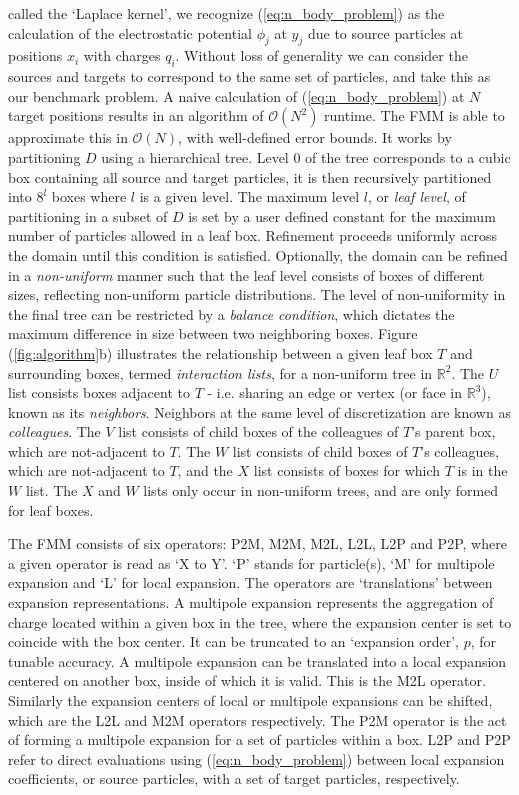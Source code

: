 \documentclass{IEEEcsmag}
\begin{document}
called the `Laplace kernel', we recognize (\ref{eq:n_body_problem}) as the calculation of the electrostatic potential $\phi_j$ at $y_j$ due to source particles at positions $x_i$ with charges $q_i$. Without loss of generality we can consider the sources and targets to correspond to the same set of particles, and take this as our benchmark problem. A naive calculation of (\ref{eq:n_body_problem}) at $N$ target positions results in an algorithm of $\mathcal{O}(N^2)$ runtime. The FMM is able to approximate this in $\mathcal{O}(N)$, with well-defined error bounds. It works by partitioning $D$ using a hierarchical tree. Level $0$ of the tree corresponds to a cubic box containing all source and target particles, it is then recursively partitioned into $8^l$ boxes where $l$ is a given level. The maximum level $l$, or \textit{leaf level}, of partitioning in a subset of $D$ is set by a user defined constant for the maximum number of particles allowed in a leaf box. Refinement proceeds uniformly across the domain until this condition is satisfied. Optionally, the domain can be refined in a \textit{non-uniform} manner such that the leaf level consists of boxes of different sizes, reflecting non-uniform particle distributions. The level of non-uniformity in the final tree can be restricted by a \textit{balance condition}, which dictates the maximum difference in size between two neighboring boxes. Figure (\ref{fig:algorithm}b) illustrates the relationship between a given leaf box $T$ and surrounding boxes, termed \textit{interaction lists}, for a non-uniform tree in $\mathbb{R}^2$. The $U$ list consists boxes adjacent to $T$ - i.e. sharing an edge or vertex (or face in $\mathbb{R}^3$), known as its \textit{neighbors}. Neighbors at the same level of discretization are known as \textit{colleagues}.  The $V$ list consists of child boxes of the colleagues of $T$'s parent box, which are not-adjacent to $T$. The $W$ list consists of child boxes of $T$'s colleagues, which are not-adjacent to $T$, and the $X$ list consists of boxes for which $T$ is in the $W$ list. The $X$ and $W$ lists only occur in non-uniform trees, and are only formed for leaf boxes.

The FMM consists of six operators: P2M, M2M, M2L, L2L, L2P and P2P, where a given operator is read as `X to Y'. `P' stands for particle(s), `M' for multipole expansion and `L' for local expansion. The operators are `translations' between expansion representations. A multipole expansion represents the aggregation of charge located within a given box in the tree, where the expansion center is set to coincide with the box center. It can be truncated to an `expansion order', $p$, for tunable accuracy. A multipole expansion can be translated into a local expansion centered on another box, inside of which it is valid. This is the M2L operator. Similarly the expansion centers of local or multipole expansions can be shifted, which are the L2L and M2M operators respectively. The P2M operator is the act of forming a multipole expansion for a set of particles within a box. L2P and P2P refer to direct evaluations using (\ref{eq:n_body_problem}) between local expansion coefficients, or source particles, with a set of target particles, respectively.
\end{document}

